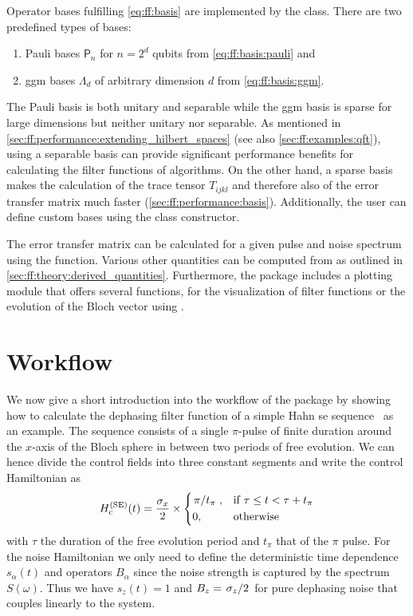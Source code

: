 Operator bases fulfilling \cref{eq:ff:basis} are implemented by the  class.
There are two predefined types of bases:
\begin{enumerate}
    \item Pauli bases $\mathsf{P}_n$ for $n = 2^d$ qubits from \cref{eq:ff:basis:pauli} and
    \item \gls{ggm} bases $\mathsf{Λ}_d$ of arbitrary dimension $d$ from \cref{eq:ff:basis:ggm}.
\end{enumerate}
The Pauli basis is both unitary and separable while the \gls{ggm} basis is sparse for large dimensions but neither unitary nor separable.
As mentioned in \cref{sec:ff:performance:extending_hilbert_spaces} (see also \cref{sec:ff:examples:qft}), using a separable basis can provide significant performance benefits for calculating the filter functions of algorithms.
On the other hand, a sparse basis makes the calculation of the trace tensor $T_{ijkl}$ and therefore also of the error transfer matrix \liouvUe much faster (\cf \cref{sec:ff:performance:basis}).
Additionally, the user can define custom bases using the class constructor.

The error transfer matrix \liouvUe can be calculated for a given pulse and noise spectrum using the  function.
Various other quantities can be computed from \liouvUe as outlined in \cref{sec:ff:theory:derived_quantities}.
Furthermore, the package includes a plotting module that offers several functions, \eg for the visualization of filter functions or the evolution of the Bloch vector using \qutip.

\section{Workflow}\label{sec:ff:software:workflow}
We now give a short introduction into the workflow of the \filterfunctions package by showing how to calculate the dephasing filter function of a simple Hahn \gls{se} sequence~\cite{Hahn1950} as an example.
The sequence consists of a single $\pi$-pulse of finite duration around the $x$-axis of the Bloch sphere in between two periods of free evolution.
We can hence divide the control fields into three constant segments and write the control Hamiltonian as
\begin{equation}
    \Hc\gth{\mr{SE}}(t) = \frac{\sx}{2}\times\begin{dcases}
                                                 \flatfrac{\pi}{t_\pi},  &\mr{if\;} \tau\leq t < \tau + t_\pi \\
                                                 0,                      &\mr{otherwise} \\
    \end{dcases}
\end{equation}
with $\tau$ the duration of the free evolution period and $t_\pi$ that of the $\pi$ pulse.
For the noise Hamiltonian we only need to define the deterministic time dependence $s_\alpha(t)$ and operators $B_\alpha$ since the noise strength is captured by the spectrum $S(\omega)$.
Thus we have $s_z(t) =  1$ and $B_z = \flatfrac{\sz}{2}$ for pure dephasing noise that couples linearly to the system.

